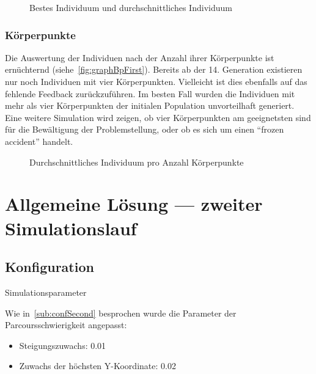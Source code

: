       \begin{figure}
        \centering
        
        \caption{Bestes Individuum und durchschnittliches Individuum\label{fig:graphFirst}}
      \end{figure}

      \subsubsection{Körperpunkte\label{subsub:bp}}

        Die Auswertung der Individuen nach der Anzahl ihrer Körperpunkte ist ernüchternd (siehe~\vref{fig:graphBpFirst}).
        Bereits ab der 14. Generation existieren nur noch Individuen mit vier Körperpunkten.
        Vielleicht ist dies ebenfalls auf das fehlende Feedback zurückzuführen.
        Im besten Fall wurden die Individuen mit mehr als vier Körperpunkten der initialen Population unvorteilhaft generiert.
        Eine weitere Simulation wird zeigen,
        ob vier Körperpunkten am geeignetsten sind für die Bewältigung der Problemstellung,
        oder ob es sich um einen ``frozen accident'' handelt.

        \begin{figure}[H]
          \centering
          
          \caption{Durchschnittliches Individuum pro Anzahl Körperpunkte\label{fig:graphBpFirst}}
        \end{figure}

  \section{Allgemeine Lösung --- zweiter Simulationslauf}

    \subsection{Konfiguration}

      \begin{table}[H]
        \centering
        
        \caption{Simulationsparameter}
      \end{table}
      Wie in~\vref{sub:confSecond} besprochen wurde die Parameter der Parcoursschwierigkeit angepasst:

      \begin{itemize}
        \item Steigungszuwachs: 0.01
        \item Zuwachs der höchsten Y-Koordinate: 0.02
      \end{itemize}

